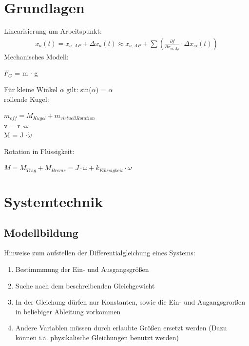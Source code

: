 \documentclass[10pt,a4paper]{article}
\begin{document}
\twocolumn
\pagestyle{fancy}
\section{Grundlagen}
    Linearisierung um Arbeitspunkt:
    \begin{align*}
        x_{a}(t)=x_{a,AP}+\Delta x_{a}(t) \approx x_{a,AP}+\sum\left(\frac{\partial f}
        {\partial x_{ei,Ap}} \cdot \Delta x_{ei}(t)\right)
    \end{align*}
    Mechanisches Modell:
    \begin{center}
        $F_G$ = m $\cdot$ g\\
    \end{center}
    Für kleine Winkel $\alpha$ gilt: sin($\alpha$) = $\alpha$\\
        rollende Kugel:\\
        \begin{center}
        $m_{eff} = M_{Kugel} + m_{virtuell Rotation}$\\
        v = r $\cdot \omega$\\
        M = J $\cdot \dot{\omega}$\\
        \end{center}
    Rotation in Flüssigkeit:
        \begin{center}
            $M=M_{Träg}+M_{Brems}=J \cdot \dot{\omega} +k_{Flüssigkeit} \cdot \omega$
        \end{center}












\section{Systemtechnik}
  \subsection{Modellbildung}
  Hinweise zum aufstellen der Differentialgleichung eines Systems:
  \begin{mdframed}[style=exercise]
  \begin{enumerate}
      \item Bestimmmung der Ein- und Ausgangsgrößen
      \item Suche nach dem beschreibenden Gleichgewicht
      \item In der Gleichung dürfen nur Konstanten, sowie die Ein- und
          Augangsgrorßen in beliebiger Ableitung vorkommen
      \item Andere Variablen müssen durch erlaubte Größen ersetzt werden (Dazu
          können i.a. physikalische Gleichungen benutzt werden)
    \end{enumerate}
\end{mdframed}
\end{document}
